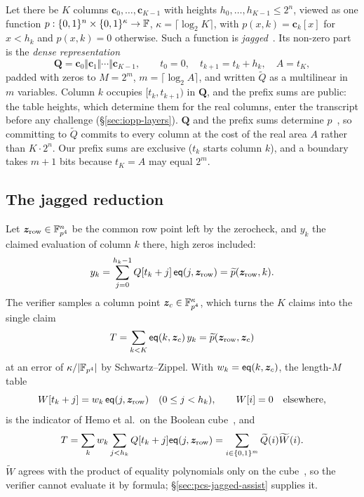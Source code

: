 Let there be $K$ columns $\mathbf c_0, \ldots, \mathbf c_{K-1}$ with heights $h_0, \ldots, h_{K-1} \le 2^{n}$, viewed as one function $p : \{0,1\}^n \times \{0,1\}^{\kappa} \to \mathbb{F}$, $\kappa = \lceil \log_2 K \rceil$, with $p(x, k) = \mathbf c_k[x]$ for $x < h_k$ and $p(x, k) = 0$ otherwise. Such a function is \emph{jagged}~\citep[Def.~1.1]{jagged-pcs}. Its non-zero part is the \emph{dense representation}
\[
  \mathbf Q = \mathbf c_0 \Vert \mathbf c_1 \Vert \cdots \Vert \mathbf c_{K-1},
  \qquad
  t_0 = 0,\quad t_{k+1} = t_k + h_k,\quad A = t_K,
\]
padded with zeros to $M = 2^m$, $m = \lceil \log_2 A \rceil$, and written $\widetilde Q$ as a multilinear in $m$ variables. Column $k$ occupies $[t_k, t_{k+1})$ in $\mathbf Q$, and the prefix sums are public: the table heights, which determine them for the real columns, enter the transcript before any challenge (\S\ref{sec:iopp-layers}). $\mathbf Q$ and the prefix sums determine $p$~\citep[Fact~1.3]{jagged-pcs}, so committing to $\widetilde Q$ commits to every column at the cost of the real area $A$ rather than $K \cdot 2^n$. Our prefix sums are exclusive ($t_k$ starts column $k$), and a boundary takes $m+1$ bits because $t_K = A$ may equal $2^m$.

\subsection{The jagged reduction}
\label{sec:pcs-jagged}

Let $\bm z_{\mathrm{row}}\in\mathbb{F}_{p^4}^n$ be the common row point left by the zerocheck, and $y_k$ the claimed evaluation of column $k$ there, high zeros included:
\[
  y_k = \sum_{j=0}^{h_k-1} Q[t_k+j]\,\mathsf{eq}(j,\bm z_{\mathrm{row}}) = \widetilde p(\bm z_{\mathrm{row}}, k).
\]
The verifier samples a column point $\bm z_c\in\mathbb{F}_{p^4}^\kappa$, which turns the $K$ claims into the single claim
\[
  T = \sum_{k<K} \mathsf{eq}(k,\bm z_c)\, y_k = \widetilde p(\bm z_{\mathrm{row}}, \bm z_c)
\]
at an error of $\kappa/|\mathbb{F}_{p^4}|$ by Schwartz--Zippel. With $w_k = \mathsf{eq}(k, \bm z_c)$, the length-$M$ table
\[
  W[t_k+j]=w_k\,\mathsf{eq}(j,\bm z_{\mathrm{row}})\quad(0\le j<h_k),
  \qquad W[i]=0\quad\text{elsewhere},
\]
is the indicator of Hemo et al.\ on the Boolean cube~\citep[Eqs.~(3)--(4)]{jagged-pcs}, and
\begin{equation}
\label{eq:jagged-global-claim}
  T
  =\sum_kw_k\sum_{j<h_k}Q[t_k+j]\mathsf{eq}(j,\bm z_{\mathrm{row}})
  =\sum_{i\in\{0,1\}^m}\widetilde Q(i)\widetilde W(i).
\end{equation}
$\widetilde W$ agrees with the product of equality polynomials only on the cube~\citep[Rem.~3.1]{jagged-pcs}, so the verifier cannot evaluate it by formula; \S\ref{sec:pcs-jagged-assist} supplies it.

